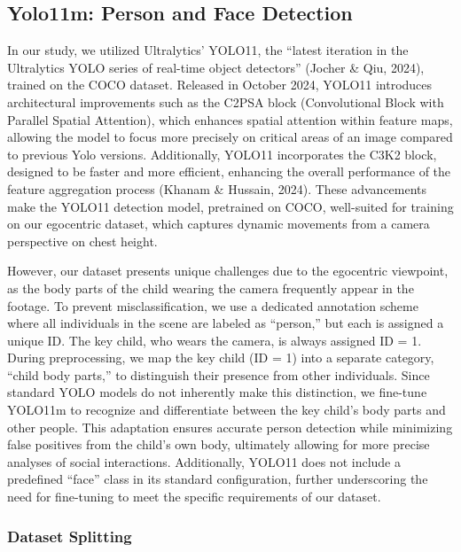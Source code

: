 \documentclass[
  man,floatsintext]{apa6}
\begin{document}
\subsection{Yolo11m: Person and Face Detection}\label{yolo11m-person-and-face-detection}

In our study, we utilized Ultralytics' YOLO11, the ``latest iteration in the Ultralytics YOLO series of real-time object detectors'' (Jocher \& Qiu, 2024), trained on the COCO dataset. Released in October 2024, YOLO11 introduces architectural improvements such as the C2PSA block (Convolutional Block with Parallel Spatial Attention), which enhances spatial attention within feature maps, allowing the model to focus more precisely on critical areas of an image compared to previous Yolo versions. Additionally, YOLO11 incorporates the C3K2 block, designed to be faster and more efficient, enhancing the overall performance of the feature aggregation process (Khanam \& Hussain, 2024). These advancements make the YOLO11 detection model, pretrained on COCO, well-suited for training on our egocentric dataset, which captures dynamic movements from a camera perspective on chest height.

However, our dataset presents unique challenges due to the egocentric viewpoint, as the body parts of the child wearing the camera frequently appear in the footage. To prevent misclassification, we use a dedicated annotation scheme where all individuals in the scene are labeled as ``person,'' but each is assigned a unique ID. The key child, who wears the camera, is always assigned ID = 1. During preprocessing, we map the key child (ID = 1) into a separate category, ``child body parts,'' to distinguish their presence from other individuals. Since standard YOLO models do not inherently make this distinction, we fine-tune YOLO11m to recognize and differentiate between the key child's body parts and other people. This adaptation ensures accurate person detection while minimizing false positives from the child's own body, ultimately allowing for more precise analyses of social interactions. Additionally, YOLO11 does not include a predefined ``face'' class in its standard configuration, further underscoring the need for fine-tuning to meet the specific requirements of our dataset.

\subsubsection{Dataset Splitting}\label{dataset-splitting}
\end{document}
